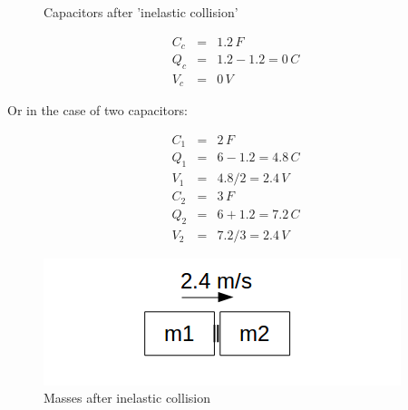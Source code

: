 \documentclass[]{../common/elementary-physics}
\begin{document}
\begin{figure}[ht] \centering
	\qquad
	\caption{Capacitors after 'inelastic collision'}
\end{figure}

\begin{eqnarray}
C_c &=& 1.2 \, F \\
Q_c &=& 1.2 - 1.2 = 0 \, C \\
V_c &=& 0 \, V
\end{eqnarray}

Or in the case of two capacitors:

\begin{eqnarray}
C_1 &=& 2 \, F \\
Q_1 &=& 6 - 1.2 = 4.8 \, C \\
V_1 &=& 4.8 / 2 = 2.4 \, V \\
C_2 &=& 3 \, F \\
Q_2 &=& 6 + 1.2 = 7.2 \, C \\
V_2 &=& 7.2 / 3 = 2.4 \, V
\end{eqnarray}

\begin{figure}[ht] \centering
	\includegraphics[scale=.5]{mms2} \caption{Masses after inelastic collision}
\end{figure}
\end{document}
